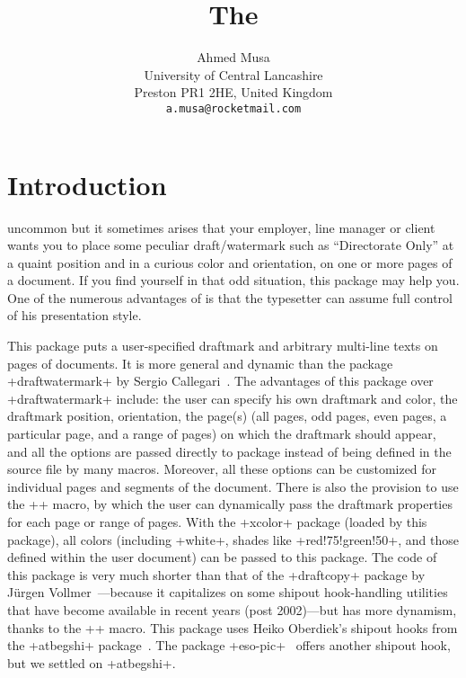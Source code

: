 \documentclass[a4paper,11pt,final]{article}
\begin{document}
\MakeShortVerb{\+}
\title{\bfseries The \texttt{}
  \\[1ex]}
\author{Ahmed Musa\\[1ex]University of Central Lancashire\\
  Preston PR1 2HE, United Kingdom\\[1ex]
  \texttt{a.musa@rocketmail.com}}
\maketitle
{}

\section{Introduction}
 uncommon but it sometimes arises that your employer, line manager or client wants you to place some peculiar draft/watermark such as ``Directorate Only'' at a quaint position and in a curious color and orientation, on one or more pages of a document. If you find yourself in that odd situation, this package may help you. One of the numerous advantages of \texorlatex is that the typesetter can assume full control of his presentation style.

This package puts a user-specified draftmark and arbitrary multi-line texts on pages of documents. It is more general and dynamic than the package +draftwatermark+ by Sergio Callegari~\cite{SCallegari2006}. The advantages of this package over +draftwatermark+ include: the user can specify his own draftmark and color, the draftmark position, orientation, the page(s) (all pages, odd pages, even pages, a particular page, and a range of pages) on which the draftmark should appear, and all the options are passed directly to package instead of being defined in the source file by many macros. Moreover, all these options can be customized for individual pages and segments of the document. There is also the provision to use the +\draftmarksetup+ macro, by which the user can dynamically pass the draftmark properties for each page or range of pages. With the +xcolor+ package (loaded by this package), all colors (including +white+, shades like +red!75!green!50+, and those defined within the user document) can be passed to this package. The code of this package is very much shorter than that of the +draftcopy+ package by J\"{u}rgen Vollmer~\cite{JVollmer2002}---because it capitalizes on some shipout hook-handling utilities that have become available in recent years (post 2002)---but has more dynamism, thanks to the +\draftmarksetup+ macro. This package uses Heiko Oberdiek's shipout hooks from the +atbegshi+ package~\cite{HOberdiek2008}. The package +eso-pic+~\cite{RNiepraschk2006} offers another shipout hook, but we settled on +atbegshi+.
\end{document}
